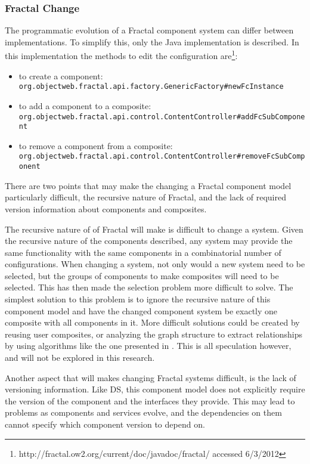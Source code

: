 \subsubsection{Fractal Change}
The programmatic evolution of a Fractal component system can differ between implementations.
To simplify this, only the Java implementation is described. 
In this implementation the methods to edit the configuration are\footnote{http://fractal.ow2.org/current/doc/javadoc/fractal/ accessed 6/3/2012}:
\begin{itemize}
  \item to create a component: \\ \texttt{org.objectweb.fractal.api.factory.GenericFactory}\verb+#+\texttt{newFcInstance}
  \item to add a component to a composite: \\ \texttt{org.objectweb.fractal.api.control.ContentController}\verb+#+\texttt{addFcSubComponent}
  \item to remove a component from a composite: \\ \texttt{org.objectweb.fractal.api.control.ContentController}\verb+#+\texttt{removeFcSubComponent}
\end{itemize}

There are two points that may make the changing a Fractal component model particularly difficult,
the recursive nature of Fractal, and the lack of required version information about components and composites.

The recursive nature of of Fractal will make is difficult to change a system. 
Given the recursive nature of the components described, any system may provide the same functionality with the same components in a combinatorial number of configurations.
When changing a system, not only would a new system need to be selected, but the groups of components to make composites will need to be selected.
This has then made the selection problem more difficult to solve.
The simplest solution to this problem is to ignore the recursive nature of this component model
and have the changed component system be exactly one composite with all components in it.
More difficult solutions could be created by reusing user composites,
or analyzing the graph structure to extract relationships by using algorithms like the one presented in \citep{dietrich2008cluster}.
This is all speculation however, and will not be explored in this research.


Another aspect that will makes changing Fractal systems difficult, is the lack of versioning information.
Like DS, this component model does not explicitly require the version of the component and the interfaces they provide.
This may lead to problems as components and services evolve, and the dependencies on them cannot specify which component version to depend on.

